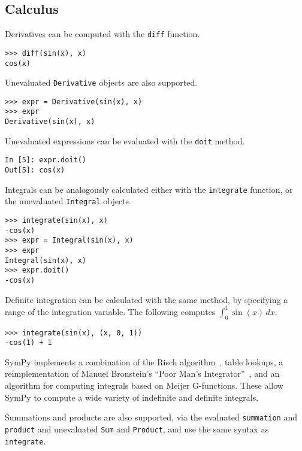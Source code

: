 \subsection{Calculus}


Derivatives can be computed with the \verb|diff| function.

\begin{verbatim}
>>> diff(sin(x), x)
cos(x)
\end{verbatim}

Unevaluated \verb|Derivative| objects are also supported.

\begin{verbatim}
>>> expr = Derivative(sin(x), x)
>>> expr
Derivative(sin(x), x)
\end{verbatim}

Unevaluated expressions can be evaluated with the \verb|doit| method.

\begin{verbatim}
In [5]: expr.doit()
Out[5]: cos(x)
\end{verbatim}

Integrals can be analogously calculated either with the \verb|integrate|
function, or the unevaluated \verb|Integral| objects.
\begin{verbatim}
>>> integrate(sin(x), x)
-cos(x)
>>> expr = Integral(sin(x), x)
>>> expr
Integral(sin(x), x)
>>> expr.doit()
-cos(x)
\end{verbatim}
Definite integration can be calculated with the same method, by specifying a
range of the integration variable. The following computes $\int_0^1\sin(x)\,dx$.
\begin{verbatim}
>>> integrate(sin(x), (x, 0, 1))
-cos(1) + 1
\end{verbatim}

SymPy implements a combination of the Risch
algorithm~\cite{bronstein2005integration}, table lookups, a reimplementation
of Manuel Bronstein's ``Poor Man's Integrator''~\cite{Bronstein2005pmint}, and
an algorithm for computing integrals based on Meijer G-functions. These allow
SymPy to compute a wide variety of indefinite and definite integrals.

Summations and products are also supported, via the evaluated \verb|summation|
and \verb|product| and unevaluated \verb|Sum| and \verb|Product|, and use the
same syntax as \verb|integrate|.

